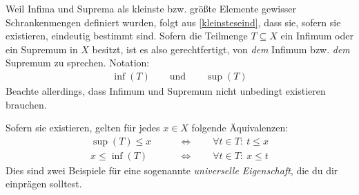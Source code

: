 \begin{nota}
    Weil Infima und Suprema als kleinste bzw. größte Elemente gewisser Schrankenmengen definiert wurden, folgt aus \cref{kleinsteseind}, dass sie, sofern sie existieren, eindeutig bestimmt sind. Sofern die Teilmenge $T\subseteq X$ ein Infimum oder ein Supremum in $X$ besitzt, ist es also gerechtfertigt, von \emph{dem} Infimum bzw. \emph{dem} Supremum zu sprechen. Notation:
    \begin{align*}
        \inf(T) \qquad\text{und}\qquad \sup(T)
    \end{align*}
    Beachte allerdings, dass Infimum und Supremum nicht unbedingt existieren brauchen.

    Sofern sie existieren, gelten für jedes $x\in X$ folgende Äquivalenzen:
    \begin{align*}
        \sup(T)\le x \qquad&\Leftrightarrow\qquad \forall t\in T:\ t\le x \\
        x\le \inf(T) \qquad&\Leftrightarrow\qquad \forall t\in T:\ x\le t
    \end{align*}
    Dies sind zwei Beispiele für eine sogenannte \emph{universelle Eigenschaft}, die du dir einprägen solltest.
\end{nota}


